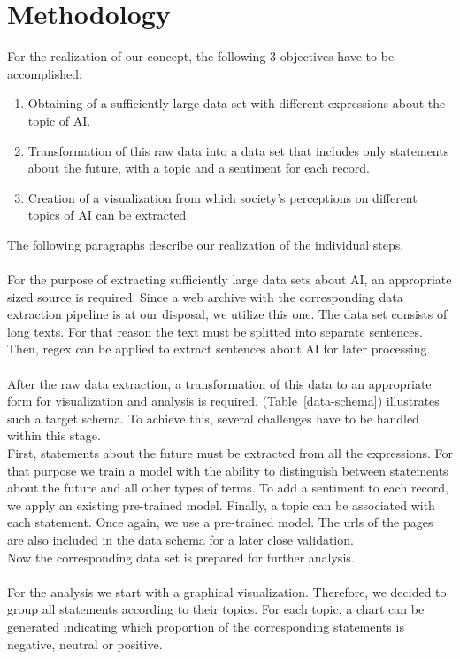 \section{Methodology}

For the realization of our concept, the following 3 objectives have to be accomplished:

\begin{enumerate}
    \item Obtaining of a sufficiently large data set with different expressions about the topic of AI.
    \item Transformation of this raw data into a data set that includes only statements about the future, with a topic and a sentiment for each record.
    \item Creation of a visualization from which society's perceptions on different topics of AI can be extracted.
\end{enumerate}%
%
The following paragraphs describe our realization of the individual steps. 
\\
\\
For the purpose of extracting sufficiently large data sets about AI, an appropriate sized source is required.
Since a web archive with the corresponding data extraction pipeline is at our disposal, we utilize this one.
The data set consists of long texts.
For that reason the text must be splitted into separate sentences.
Then, regex can be applied to extract sentences about AI for later processing.
\\
\\
After the raw data extraction, a transformation of this data to an appropriate form for visualization and analysis is required.
(Table~\ref{data-schema}) illustrates such a target schema.
To achieve this, several challenges have to be handled within this stage.
\\
First, statements about the future must be extracted from all the expressions.
For that purpose we train a model with the ability to distinguish between statements about the future and all other types of terms.
To add a sentiment to each record, we apply an existing pre-trained model.
Finally, a topic can be associated with each statement.
Once again, we use a pre-trained model.
The urls of the pages are also included in the data schema for a later close validation.
\\
Now the corresponding data set is prepared for further analysis.
\\
\\
For the analysis we start with a graphical visualization.
Therefore, we decided to group all statements according to their topics.
For each topic, a chart can be generated indicating which proportion of the corresponding statements is negative, neutral or positive.

